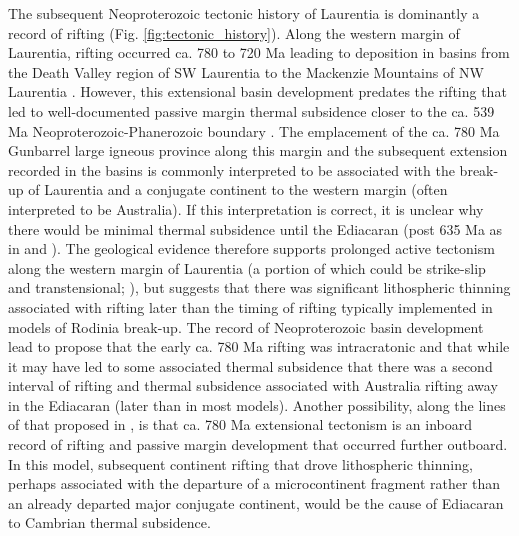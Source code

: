 \documentclass[11pt,letterpaper]{article}
\begin{document}
The subsequent Neoproterozoic tectonic history of Laurentia is dominantly a record of rifting (Fig. \ref{fig:tectonic_history}). Along the western margin of Laurentia, rifting occurred ca. 780 to 720 Ma leading to deposition in basins from the Death Valley region of SW Laurentia to the Mackenzie Mountains of NW Laurentia \citep{Macdonald2013a, Dehler2017a, Rooney2017a}. However, this extensional basin development predates the rifting that led to well-documented passive margin thermal subsidence closer to the ca. 539 Ma Neoproterozoic-Phanerozoic boundary \citep{Bond1984a, Levy1991a}. The emplacement of the ca. 780 Ma Gunbarrel large igneous province along this margin and the subsequent extension recorded in the basins is commonly interpreted to be associated with the break-up of Laurentia and a conjugate continent to the western margin (often interpreted to be Australia). If this interpretation is correct, it is unclear why there would be minimal thermal subsidence until the Ediacaran (post 635 Ma as in \citealp{Levy1991a} and \citealp{Witkosky2018a}). The geological evidence therefore supports prolonged active tectonism along the western margin of Laurentia (a portion of which could be strike-slip and transtensional; \citealp{Smith2015b}), but suggests that there was significant lithospheric thinning associated with rifting later than the timing of rifting typically implemented in models of Rodinia break-up. The record of Neoproterozoic basin development lead \cite{Yonkee2014a} to propose that the early ca. 780 Ma rifting was intracratonic and that while it may have led to some associated thermal subsidence that there was a second interval of rifting and thermal subsidence associated with Australia rifting away in the Ediacaran (later than in most models). Another possibility, along the lines of that proposed in \citet{Ross1991a}, is that ca. 780 Ma extensional tectonism is an inboard record of rifting and passive margin development that occurred further outboard. In this model, subsequent continent rifting that drove lithospheric thinning, perhaps associated with the departure of a microcontinent fragment rather than an already departed major conjugate continent, would be the cause of Ediacaran to Cambrian thermal subsidence. 
\end{document}
